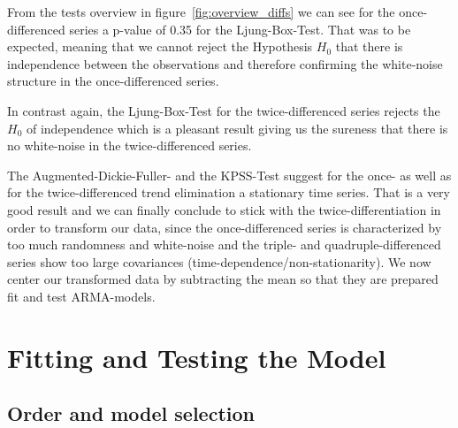 \documentclass[11pt,a4paper]{article}
\begin{document}
From the tests overview in figure~\ref{fig:overview_diffs} we can see for the once-differenced series a p-value of 0.35 for the Ljung-Box-Test.
That was to be expected, meaning that we cannot reject the Hypothesis $H_0$ that there is independence between the observations \citep{LjungBox78} and therefore confirming the white-noise structure in the once-differenced series.

In contrast again, the Ljung-Box-Test for the twice-differenced series rejects the $H_0$ of independence which is a pleasant result giving us the sureness that there is no white-noise in the twice-differenced series.

The Augmented-Dickie-Fuller- and the KPSS-Test suggest for the once- as well as for the twice-differenced trend elimination a stationary time series.
That is a very good result and we can finally conclude to stick with the twice-differentiation in order to transform our data, since the once-differenced series is characterized by too much randomness and white-noise and the triple- and quadruple-differenced series show too large covariances (time-dependence/non-stationarity).
We now center our transformed data by subtracting the mean so that they are prepared fit and test ARMA-models.



\section{Fitting and Testing the Model}
\label{sec:FitTestModel}

\subsection{Order and model selection}
\end{document}
